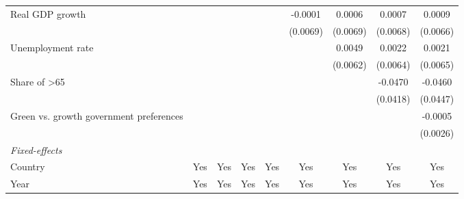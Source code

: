\begin{table}[htbp]
\begin{tabular}{lcccccccc}
      Real GDP growth                                                                  &          &          &                 &                 & -0.0001         & 0.0006          & 0.0007          & 0.0009\\   
                                                                                       &          &          &                 &                 & (0.0069)        & (0.0069)        & (0.0068)        & (0.0066)\\   
      Unemployment rate                                                                &          &          &                 &                 &                 & 0.0049          & 0.0022          & 0.0021\\   
                                                                                       &          &          &                 &                 &                 & (0.0062)        & (0.0064)        & (0.0065)\\   
      Share of >65                                                                     &          &          &                 &                 &                 &                 & -0.0470         & -0.0460\\   
                                                                                       &          &          &                 &                 &                 &                 & (0.0418)        & (0.0447)\\   
      Green vs. growth government preferences                                          &          &          &                 &                 &                 &                 &                 & -0.0005\\   
                                                                                       &          &          &                 &                 &                 &                 &                 & (0.0026)\\   
      \midrule
      \emph{Fixed-effects}\\
      Country                                                                          & Yes      & Yes      & Yes             & Yes             & Yes             & Yes             & Yes             & Yes\\  
      Year                                                                             & Yes      & Yes      & Yes             & Yes             & Yes             & Yes             & Yes             & Yes\\  

\end{tabular}
\end{table}
